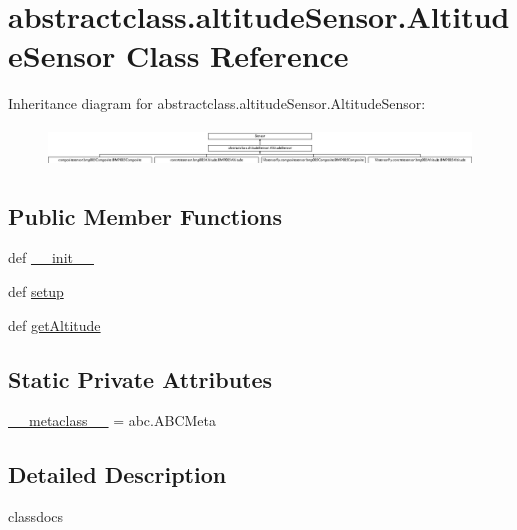 \hypertarget{classabstractclass_1_1altitudeSensor_1_1AltitudeSensor}{}\section{abstractclass.\+altitude\+Sensor.\+Altitude\+Sensor Class Reference}
\label{classabstractclass_1_1altitudeSensor_1_1AltitudeSensor}
Inheritance diagram for abstractclass.\+altitude\+Sensor.\+Altitude\+Sensor\+:\begin{figure}[H]
\begin{center}
\leavevmode
\includegraphics[height=1.050000cm]{classabstractclass_1_1altitudeSensor_1_1AltitudeSensor}
\end{center}
\end{figure}
\subsection*{Public Member Functions}
\begin{DoxyCompactItemize}
\item 
def \hyperlink{classabstractclass_1_1altitudeSensor_1_1AltitudeSensor_a655ca1485b735c82b701370018a0a0f2}{\+\_\+\+\_\+init\+\_\+\+\_\+}
\item 
def \hyperlink{classabstractclass_1_1altitudeSensor_1_1AltitudeSensor_a4c51609c04493913f1694821287cbd66}{setup}
\item 
def \hyperlink{classabstractclass_1_1altitudeSensor_1_1AltitudeSensor_ab12fee27a4378f163c443b297df3c9c3}{get\+Altitude}
\end{DoxyCompactItemize}
\subsection*{Static Private Attributes}
\begin{DoxyCompactItemize}
\item 
\hyperlink{classabstractclass_1_1altitudeSensor_1_1AltitudeSensor_ac1bf8a05027c73e37980ed1ddf39eb52}{\+\_\+\+\_\+metaclass\+\_\+\+\_\+} = abc.\+A\+B\+C\+Meta
\end{DoxyCompactItemize}


\subsection{Detailed Description}
\begin{DoxyVerb}classdocs
\end{DoxyVerb}
 

